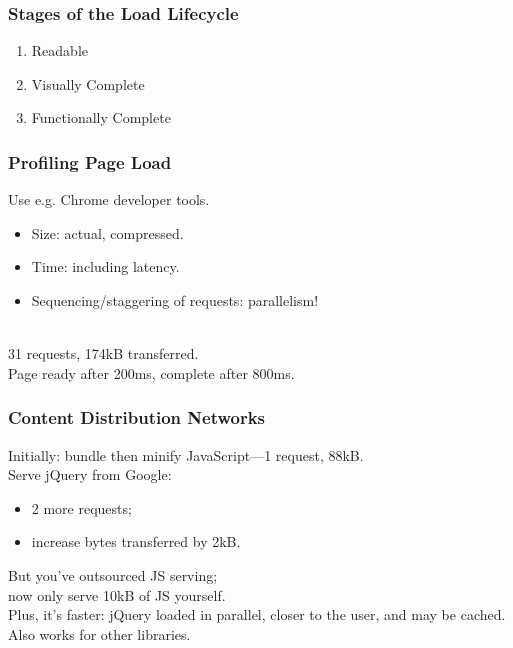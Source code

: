 \documentclass[aspectratio=43]{beamer}
\newenvironment{changemargin}[1]{%
  \begin{list}{}{%
    \setlength{\topsep}{0pt}%
    \setlength{\leftmargin}{#1}%
    \setlength{\rightmargin}{1em}
    \setlength{\listparindent}{\parindent}%
    \setlength{\itemindent}{\parindent}%
    \setlength{\parsep}{\parskip}%
  }%
  \item[]}{\end{list}}
\begin{document}
\begin{frame}
  \frametitle{Stages of the Load Lifecycle}

  \begin{changemargin}{2cm}
    \begin{enumerate}
    \item Readable
      \item Visually Complete
      \item Functionally Complete
    \end{enumerate}

  \end{changemargin}
  
\end{frame}

\begin{frame}
  \frametitle{Profiling Page Load}
  \begin{changemargin}{2cm}
    Use e.g. Chrome developer tools.
    \begin{itemize}
    \item Size: actual, compressed.
    \item Time: including latency.
    \item Sequencing/staggering of requests: parallelism!
    \end{itemize}~\\[1em]
    31 requests, 174kB transferred.\\
    Page ready after 200ms, complete after 800ms.
    \end{changemargin}
\end{frame}

\begin{frame}
  \frametitle{Content Distribution Networks}

  \begin{changemargin}{2cm}
    Initially: bundle then minify JavaScript---1 request, 88kB.\\[1em]
    Serve jQuery from Google:
    \begin{itemize}
    \item 2 more requests;
    \item increase bytes transferred by 2kB.
    \end{itemize}
    But you've outsourced JS serving;\\
    \hspace*{1em} now only serve 10kB of JS yourself.\\[1em]
    Plus, it's faster: jQuery loaded in parallel, closer to the user, and may be cached.\\[1em]
    Also works for other libraries.
  \end{changemargin}
  
\end{frame}
\end{document}
